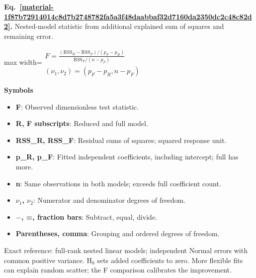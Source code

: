 \documentclass[11pt,a4paper]{article}
\begin{document}
\par\medskip
\noindent\begin{minipage}{\linewidth}
\label{material-1f87b72914014c8d7b2748782fa5a3f48daabbaf32d7160da2350dc2c48c82d2}
\noindent\textbf{Eq.~\ref*{material-1f87b72914014c8d7b2748782fa5a3f48daabbaf32d7160da2350dc2c48c82d2}.} Nested-model statistic from additional explained sum of squares and remaining error.\par\nopagebreak
\begin{center}\begin{adjustbox}{max width=\linewidth}$\displaystyle \begin{gathered}F=\frac{(\mathrm{RSS}_R-\mathrm{RSS}_F)/(p_F-p_R)}{\mathrm{RSS}_F/(n-p_F)}\\(\nu_1,\nu_2)=(p_F-p_R,n-p_F)\end{gathered}$\end{adjustbox}\end{center}

\par\noindent\textbf{Symbols}

\begin{itemize}\setlength{\itemsep}{1pt}\setlength{\parsep}{0pt}
\item \textbf{F}: Observed dimensionless test statistic.
\item \textbf{R, F subscripts}: Reduced and full model.
\item \textbf{RSS\_R, RSS\_F}: Residual sums of squares; squared response unit.
\item \textbf{p\_R, p\_F}: Fitted independent coefficients, including intercept; full has more.
\item \textbf{n}: Same observations in both models; exceeds full coefficient count.
\item \textbf{\ensuremath{\nu}\ensuremath{{}_1}, \ensuremath{\nu}\ensuremath{{}_2}}: Numerator and denominator degrees of freedom.
\item \textbf{\ensuremath{-}, =, fraction bars}: Subtract, equal, divide.
\item \textbf{Parentheses, comma}: Grouping and ordered degrees of freedom.
\end{itemize}

Exact reference: full-rank nested linear models; independent Normal errors with common positive variance. H\ensuremath{{}_0} sets added coefficients to zero. More flexible fits can explain random scatter; the F comparison calibrates the improvement.

\end{minipage}\par
\medskip
\end{document}
